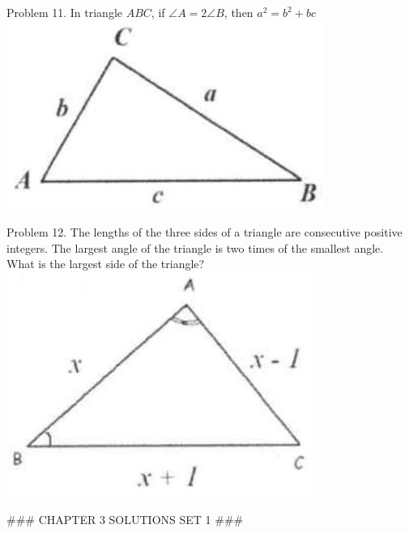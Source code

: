 \documentclass[10pt]{article}
\begin{document}
Problem 11. In triangle \(A B C\), if \(\angle A=2 \angle B\), then \(a^{2}=b^{2}+b c\)\\
\includegraphics[max width=\textwidth, center]{2025_04_17_97bc1f7e44d93c271a88g-066(1)}

Problem 12. The lengths of the three sides of a triangle are consecutive positive integers. The largest angle of the triangle is two times of the smallest angle. What is the largest side of the triangle?\\
\includegraphics[max width=\textwidth, center]{2025_04_17_97bc1f7e44d93c271a88g-066(3)}


### CHAPTER 3 SOLUTIONS SET 1 ###
\end{document}

